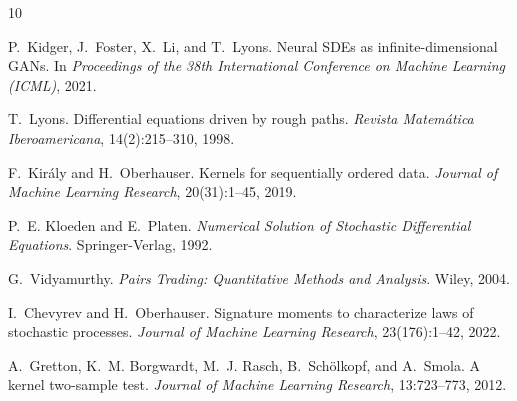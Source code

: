 \documentclass[11pt, a4paper]{article}
\begin{document}

\begin{thebibliography}{10}

P.~Kidger, J.~Foster, X.~Li, and T.~Lyons.
\newblock Neural {SDEs} as infinite-dimensional {GANs}.
\newblock In \emph{Proceedings of the 38th International Conference on Machine Learning (ICML)}, 2021.

T.~Lyons.
\newblock Differential equations driven by rough paths.
\newblock \emph{Revista Matem\'atica Iberoamericana}, 14(2):215--310, 1998.

F.~Kir\'aly and H.~Oberhauser.
\newblock Kernels for sequentially ordered data.
\newblock \emph{Journal of Machine Learning Research}, 20(31):1--45, 2019.

P.~E. Kloeden and E.~Platen.
\newblock \emph{Numerical Solution of Stochastic Differential Equations}.
\newblock Springer-Verlag, 1992.

G.~Vidyamurthy.
\newblock \emph{Pairs Trading: Quantitative Methods and Analysis}.
\newblock Wiley, 2004.

I.~Chevyrev and H.~Oberhauser.
\newblock Signature moments to characterize laws of stochastic processes.
\newblock \emph{Journal of Machine Learning Research}, 23(176):1--42, 2022.

A.~Gretton, K.~M. Borgwardt, M.~J. Rasch, B.~Sch\"olkopf, and A.~Smola.
\newblock A kernel two-sample test.
\newblock \emph{Journal of Machine Learning Research}, 13:723--773, 2012.

\end{thebibliography}
\end{document}
